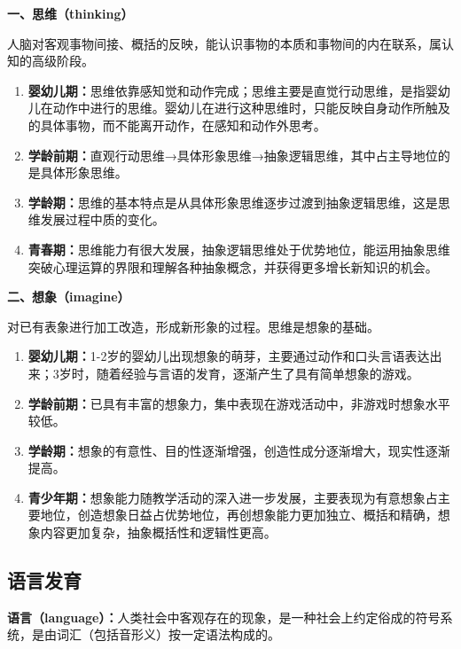 \begin{keybox}
\textbf{一、思维（thinking）}

人脑对客观事物间接、概括的反映，能认识事物的本质和事物间的内在联系，属认知的高级阶段。

\begin{enumerate}[leftmargin=*]
    \item \textbf{婴幼儿期：}思维依靠感知觉和动作完成；思维主要是直觉行动思维，是指婴幼儿在动作中进行的思维。婴幼儿在进行这种思维时，只能反映自身动作所触及的具体事物，而不能离开动作，在感知和动作外思考。
    \item \textbf{学龄前期：}直观行动思维→具体形象思维→抽象逻辑思维，其中占主导地位的是具体形象思维。
    \item \textbf{学龄期：}思维的基本特点是从具体形象思维逐步过渡到抽象逻辑思维，这是思维发展过程中质的变化。
    \item \textbf{青春期：}思维能力有很大发展，抽象逻辑思维处于优势地位，能运用抽象思维突破心理运算的界限和理解各种抽象概念，并获得更多增长新知识的机会。
\end{enumerate}

\textbf{二、想象（imagine）}

对已有表象进行加工改造，形成新形象的过程。思维是想象的基础。

\begin{enumerate}[leftmargin=*]
    \item \textbf{婴幼儿期：}1-2岁的婴幼儿出现想象的萌芽，主要通过动作和口头言语表达出来；3岁时，随着经验与言语的发育，逐渐产生了具有简单想象的游戏。
    \item \textbf{学龄前期：}已具有丰富的想象力，集中表现在游戏活动中，非游戏时想象水平较低。
    \item \textbf{学龄期：}想象的有意性、目的性逐渐增强，创造性成分逐渐增大，现实性逐渐提高。
    \item \textbf{青少年期：}想象能力随教学活动的深入进一步发展，主要表现为有意想象占主要地位，创造想象日益占优势地位，再创想象能力更加独立、概括和精确，想象内容更加复杂，抽象概括性和逻辑性更高。
\end{enumerate}
\end{keybox}

\subsection{语言发育}

\begin{defbox}
\textbf{语言（language）：}人类社会中客观存在的现象，是一种社会上约定俗成的符号系统，是由词汇（包括音形义）按一定语法构成的。
\end{defbox}


